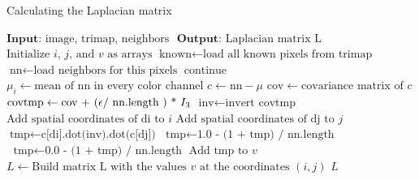 \begin{algorithm}[t]
	\caption{Calculating the Laplacian matrix}\label{laplace}
	\begin{algorithmic}[1]
		\State $\textbf{Input: }  \text{image, trimap, neighbors }$
		\State $\textbf{Output: }  \text{Laplacian matrix L}$
		\State $\text{Initialize \(i\), \(j\), and \(v\) as arrays}$
		\State $\text{known} \gets \text{load all known pixels from trimap}$
		\State $\text{nn} \gets \text{load neighbors for this pixels}$
		\newline
		\State $\text{continue}$
		\EndIf
		\newline
		\State $\text{\(\mu_i\)} \gets \text{mean of nn in every color channel}$
		\EndFor
		\newline
		\State $c \gets \text{nn} - \mu$
		\State $\text{cov} \gets \text{covariance matrix of \(c\)}$
		\State $\text{covtmp} \gets \text{cov + (\( \epsilon / \) nn.length ) *  \(I_3\)}$
		\State $\text{inv} \gets \text{invert covtmp}$
		\newline
		\State $\text{Add spatial coordinates of di to \(i\)} $
		\State $\text{Add spatial coordinates of dj to \(j\)} $
		\newline
		\State $\text{tmp} \gets \text{c[di].dot(inv).dot(c[dj])}$
		\newline
		\State $\text{tmp} \gets \text{1.0 - (1 + tmp) / nn.length} $
		\Else $\text{ tmp} \gets \text{0.0 - (1 + tmp) / nn.length} $
		\EndIf
		\State $\text{Add tmp to \(v\)}$
		\EndFor
		\EndFor
		\EndFor
		\State $ L \gets \text{Build matrix L with the values \(v\) at the coordinates \((i, j)\)}$
		\Return $L$
	\end{algorithmic}
\end{algorithm}

